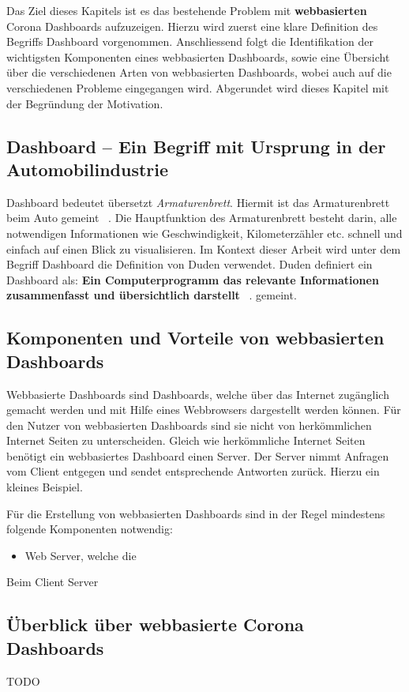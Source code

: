 \documentclass[12pt, oneside]{article}
\begin{document}
Das Ziel dieses Kapitels ist es das bestehende Problem mit \textbf{webbasierten} Corona Dashboards aufzuzeigen. Hierzu wird zuerst eine klare Definition des Begriffs Dashboard vorgenommen. Anschliessend folgt die Identifikation der wichtigsten Komponenten eines webbasierten Dashboards, sowie eine Übersicht über die verschiedenen Arten von webbasierten Dashboards, wobei auch auf die verschiedenen Probleme eingegangen wird. Abgerundet wird dieses Kapitel mit der Begründung der Motivation. 

\subsection{Dashboard – Ein Begriff mit Ursprung in der Automobilindustrie}
    Dashboard bedeutet übersetzt \textit{Armaturenbrett}. Hiermit ist das Armaturenbrett beim Auto gemeint ~\citep{Duden.18.04.2022}. Die Hauptfunktion des Armaturenbrett besteht darin, alle notwendigen Informationen wie Geschwindigkeit, Kilometerzähler etc. schnell und einfach auf einen Blick zu visualisieren. Im Kontext dieser Arbeit wird unter dem Begriff Dashboard die Definition von Duden verwendet. Duden definiert ein Dashboard als: \textbf{Ein Computerprogramm das relevante Informationen zusammenfasst und übersichtlich darstellt} ~\citep{Duden.18.04.2022}. gemeint.

\subsection{Komponenten und Vorteile von webbasierten Dashboards}
Webbasierte Dashboards sind Dashboards, welche über das Internet zugänglich gemacht werden und mit Hilfe eines Webbrowsers dargestellt werden können. Für den Nutzer von webbasierten Dashboards sind sie nicht von herkömmlichen Internet Seiten zu unterscheiden. Gleich wie herkömmliche Internet Seiten benötigt ein webbasiertes Dashboard einen Server. Der Server nimmt Anfragen vom Client entgegen und sendet entsprechende Antworten zurück. Hierzu ein kleines Beispiel. 

Für die Erstellung von webbasierten Dashboards sind in der Regel mindestens folgende Komponenten notwendig:
\begin{itemize}
    \item Web Server, welche die 
\end{itemize}

Beim Client Server

\subsection{Überblick über webbasierte Corona Dashboards}
TODO
\end{document}
